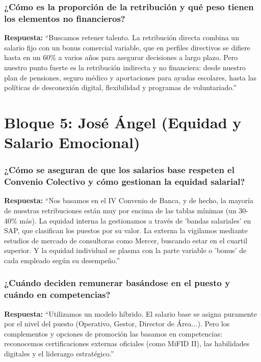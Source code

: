 \subsubsection*{¿Cómo es la proporción de la retribución y qué peso tienen los elementos no financieros?}

\textbf{Respuesta:}\newline
``Buscamos retener talento. La retribución directa combina un salario fijo con un bonus comercial variable, que en perfiles directivos se difiere hasta en un 60\% a varios años para asegurar decisiones a largo plazo. Pero nuestro punto fuerte es la retribución indirecta y no financiera: desde nuestro plan de pensiones, seguro médico y aportaciones para ayudas escolares, hasta las políticas de desconexión digital, flexibilidad y programas de voluntariado.''

\section{Bloque 5: José Ángel (Equidad y Salario Emocional)}

\subsubsection*{¿Cómo se aseguran de que los salarios base respeten el Convenio Colectivo y cómo gestionan la equidad salarial?}

\textbf{Respuesta:}\newline
``Nos basamos en el IV Convenio de Banca, y de hecho, la mayoría de nuestras retribuciones están muy por encima de las tablas mínimas (un 30-40\% más). La equidad interna la gestionamos a través de 'bandas salariales' en SAP, que clasifican los puestos por su valor. La externa la vigilamos mediante estudios de mercado de consultoras como Mercer, buscando estar en el cuartil superior. Y la equidad individual se plasma con la parte variable o 'bonus' de cada empleado según su desempeño.''

\subsubsection*{¿Cuándo deciden remunerar basándose en el puesto y cuándo en competencias?}

\textbf{Respuesta:}\newline
``Utilizamos un modelo híbrido. El salario base se asigna puramente por el nivel del puesto (Operativo, Gestor, Director de Área...). Pero los complementos y opciones de promoción las basamos en competencias: reconocemos certificaciones externas oficiales (como MiFID II), las habilidades digitales y el liderazgo estratégico.''

